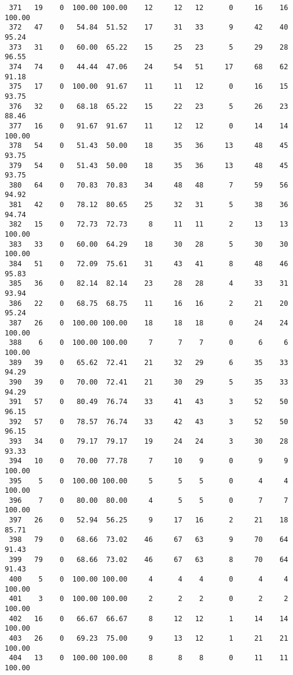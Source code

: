 \begin{verbatim}
 371   19    0  100.00 100.00    12     12   12      0     16    16   100.00
 372   47    0   54.84  51.52    17     31   33      9     42    40    95.24
 373   31    0   60.00  65.22    15     25   23      5     29    28    96.55
 374   74    0   44.44  47.06    24     54   51     17     68    62    91.18
 375   17    0  100.00  91.67    11     11   12      0     16    15    93.75
 376   32    0   68.18  65.22    15     22   23      5     26    23    88.46
 377   16    0   91.67  91.67    11     12   12      0     14    14   100.00
 378   54    0   51.43  50.00    18     35   36     13     48    45    93.75
 379   54    0   51.43  50.00    18     35   36     13     48    45    93.75
 380   64    0   70.83  70.83    34     48   48      7     59    56    94.92
 381   42    0   78.12  80.65    25     32   31      5     38    36    94.74
 382   15    0   72.73  72.73     8     11   11      2     13    13   100.00
 383   33    0   60.00  64.29    18     30   28      5     30    30   100.00
 384   51    0   72.09  75.61    31     43   41      8     48    46    95.83
 385   36    0   82.14  82.14    23     28   28      4     33    31    93.94
 386   22    0   68.75  68.75    11     16   16      2     21    20    95.24
 387   26    0  100.00 100.00    18     18   18      0     24    24   100.00
 388    6    0  100.00 100.00     7      7    7      0      6     6   100.00
 389   39    0   65.62  72.41    21     32   29      6     35    33    94.29
 390   39    0   70.00  72.41    21     30   29      5     35    33    94.29
 391   57    0   80.49  76.74    33     41   43      3     52    50    96.15
 392   57    0   78.57  76.74    33     42   43      3     52    50    96.15
 393   34    0   79.17  79.17    19     24   24      3     30    28    93.33
 394   10    0   70.00  77.78     7     10    9      0      9     9   100.00
 395    5    0  100.00 100.00     5      5    5      0      4     4   100.00
 396    7    0   80.00  80.00     4      5    5      0      7     7   100.00
 397   26    0   52.94  56.25     9     17   16      2     21    18    85.71
 398   79    0   68.66  73.02    46     67   63      9     70    64    91.43
 399   79    0   68.66  73.02    46     67   63      8     70    64    91.43
 400    5    0  100.00 100.00     4      4    4      0      4     4   100.00
 401    3    0  100.00 100.00     2      2    2      0      2     2   100.00
 402   16    0   66.67  66.67     8     12   12      1     14    14   100.00
 403   26    0   69.23  75.00     9     13   12      1     21    21   100.00
 404   13    0  100.00 100.00     8      8    8      0     11    11   100.00

\end{verbatim}
